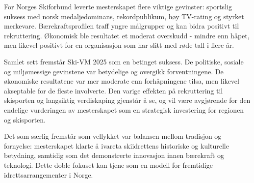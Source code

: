 For Norges Skiforbund leverte mesterskapet flere viktige gevinster: sportslig suksess med norsk medaljedominans, rekordpublikum, høy TV-rating og styrket merkevare. Bærekraftsprofilen traff yngre målgrupper og kan bidra positivt til rekruttering. Økonomisk ble resultatet et moderat overskudd - mindre enn håpet, men likevel positivt for en organisasjon som har slitt med røde tall i flere år\cite{Adresseavisen}.

Samlet sett fremstår Ski-VM 2025 som en betinget suksess. De politiske, sosiale og miljømessige gevinstene var betydelige og overgikk forventningene. De økonomiske resultatene var mer moderate enn forhåpningene tilsa, men likevel akseptable for de fleste involverte. Den varige effekten på rekruttering til skisporten og langsiktig verdiskaping gjenstår å se, og vil være avgjørende for den endelige vurderingen av mesterskapet som en strategisk investering for regionen og skisporten.

Det som særlig fremstår som vellykket var balansen mellom tradisjon og fornyelse: mesterskapet klarte å ivareta skiidrettens historiske og kulturelle betydning, samtidig som det demonstrerte innovasjon innen bærekraft og teknologi. Dette doble fokuset kan tjene som en modell for fremtidige idrettsarrangementer i Norge.

